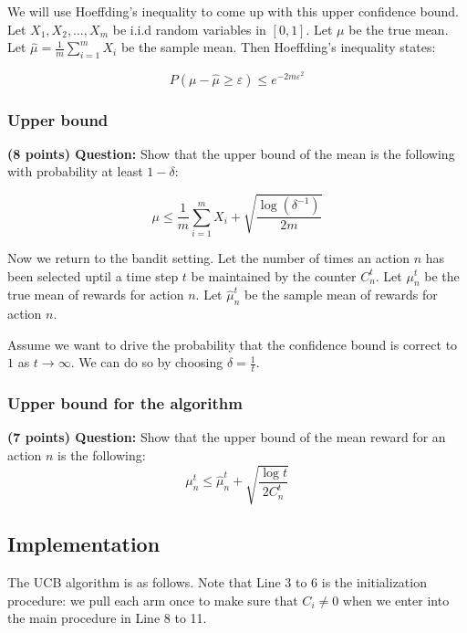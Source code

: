 \documentclass{article}
\begin{document}
We will use Hoeffding's inequality to come up with this upper confidence bound. Let $X_1, X_2, \ldots, X_m$ be i.i.d random variables in $[0,1]$. Let $\mu$ be the true mean. Let $\hat{\mu} = \frac{1}{m} \sum\limits_{i=1}^m X_i$ be the sample mean. Then Hoeffding's inequality states:

\begin{equation}
P(\mu - \hat{\mu} \geq \varepsilon) \leq e^{-2m\varepsilon^2}
\end{equation}

\subsubsection{Upper bound}
\textbf{ (8 points) Question:} Show that the upper bound of the mean is the following with probability at least $1-\delta$:

\begin{equation}
\mu \leq \frac{1}{m} \sum\limits_{i=1}^m X_i + \sqrt{ \frac{\log(\delta^{-1})}{2m} }
\end{equation}

Now we return to the bandit setting. Let the number of times an action $n$ has been selected uptil a time step $t$ be maintained by the counter $C^t_n$. 
Let $\mu^t_n$ be the true mean of rewards for action $n$.
Let $\hat{\mu}^t_n$ be the sample mean of rewards for action $n$. 


Assume we want to drive the probability that the confidence bound is correct to $1$ as $t \rightarrow \infty$. We can do so by choosing $\delta = \frac{1}{t}$. 

\subsubsection{Upper bound for the algorithm}
\textbf{(7 points) Question:} Show that the upper bound of the mean reward for an action $n$ is the following:
\begin{equation}
\mu^t_n \leq \hat{\mu}^t_n + \sqrt{ \frac{\log t}{2C^t_n} }
\end{equation}

\subsection{Implementation}

The UCB algorithm is as follows. Note that Line 3 to 6 is the initialization procedure: we pull each arm once to make sure that $C_i\neq 0$ when we enter into the main procedure in Line 8 to 11. 
\end{document}
